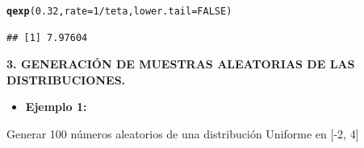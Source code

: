 \documentclass[12pt,letterpaper]{article}\usepackage[]{graphicx}\usepackage[]{color}
\makeatletter
\newcommand{\hlnum}[1]{\textcolor[rgb]{0.686,0.059,0.569}{#1}}%
\newcommand{\hlopt}[1]{\textcolor[rgb]{0,0,0}{#1}}%
\newcommand{\hlstd}[1]{\textcolor[rgb]{0.345,0.345,0.345}{#1}}%
\newcommand{\hlkwc}[1]{\textcolor[rgb]{0.333,0.667,0.333}{#1}}%
\newcommand{\hlkwd}[1]{\textcolor[rgb]{0.737,0.353,0.396}{\textbf{#1}}}%
\newenvironment{kframe}{%
 \def\at@end@of@kframe{}%
 \ifinner\ifhmode%
  \def\at@end@of@kframe{\end{minipage}}%
  \begin{minipage}{\columnwidth}%
 \fi\fi%
 \def\FrameCommand##1{\hskip\@totalleftmargin \hskip-\fboxsep
 \colorbox{shadecolor}{##1}\hskip-\fboxsep
     \hskip-\linewidth \hskip-\@totalleftmargin \hskip\columnwidth}%
 \MakeFramed {\advance\hsize-\width
   \@totalleftmargin\z@ \linewidth\hsize
   \@setminipage}}%
 {\par\unskip\endMakeFramed%
 \at@end@of@kframe}
\newenvironment{knitrout}{}{} %
\makeatother
\begin{document}
\begin{description}
\begin{knitrout}
\begin{kframe}
\begin{alltt}
\hlkwd{qexp}\hlstd{(}\hlnum{0.32}\hlstd{,} \hlkwc{rate}\hlstd{=}\hlnum{1}\hlopt{/}\hlstd{teta,} \hlkwc{lower.tail}\hlstd{=}\hlnum{FALSE}\hlstd{)}
\end{alltt}
\begin{verbatim}
## [1] 7.97604
\end{verbatim}
\end{kframe}
\end{knitrout}
\end{description}

\newpage

\begin{center}
\textbf{3.  GENERACI\'ON DE MUESTRAS ALEATORIAS DE LAS DISTRIBUCIONES.} 
\end{center}

\begin{itemize}
  \item \textbf{Ejemplo 1:}
\end{itemize}
Generar 100 n\'umeros aleatorios de una distribuci\'on Uniforme en [-2, 4]
\end{document}

